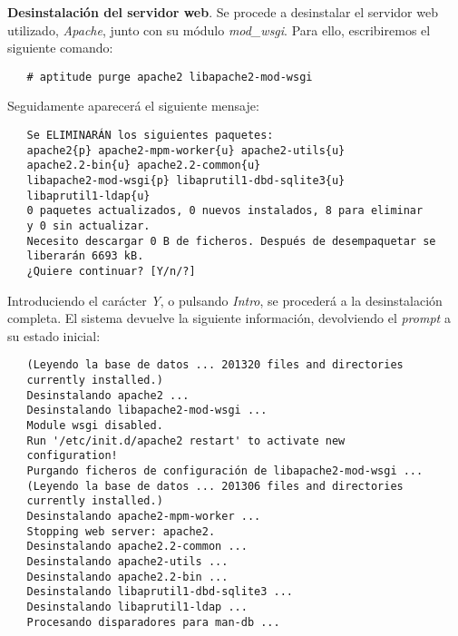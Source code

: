 \item \textbf{Desinstalación del servidor web}.
   Se procede a desinstalar el servidor web utilizado, \textit{Apache}, junto
   con su módulo \textit{mod\_wsgi}. Para ello, escribiremos el siguiente
   comando:

   \begin{verbatim}
   # aptitude purge apache2 libapache2-mod-wsgi
   \end{verbatim}

   Seguidamente aparecerá el siguiente mensaje:

   \begin{verbatim}
   Se ELIMINARÁN los siguientes paquetes:
   apache2{p} apache2-mpm-worker{u} apache2-utils{u}
   apache2.2-bin{u} apache2.2-common{u}
   libapache2-mod-wsgi{p} libaprutil1-dbd-sqlite3{u}
   libaprutil1-ldap{u}
   0 paquetes actualizados, 0 nuevos instalados, 8 para eliminar
   y 0 sin actualizar.
   Necesito descargar 0 B de ficheros. Después de desempaquetar se
   liberarán 6693 kB.
   ¿Quiere continuar? [Y/n/?]
   \end{verbatim}

   Introduciendo el carácter \textit{Y}, o pulsando \textit{Intro}, se procederá
   a la desinstalación completa. El sistema devuelve la siguiente información,
   devolviendo el \textit{prompt} a su estado inicial:

   \begin{verbatim}
   (Leyendo la base de datos ... 201320 files and directories
   currently installed.)
   Desinstalando apache2 ...
   Desinstalando libapache2-mod-wsgi ...
   Module wsgi disabled.
   Run '/etc/init.d/apache2 restart' to activate new
   configuration!
   Purgando ficheros de configuración de libapache2-mod-wsgi ...
   (Leyendo la base de datos ... 201306 files and directories
   currently installed.)
   Desinstalando apache2-mpm-worker ...
   Stopping web server: apache2.
   Desinstalando apache2.2-common ...
   Desinstalando apache2-utils ...
   Desinstalando apache2.2-bin ...
   Desinstalando libaprutil1-dbd-sqlite3 ...
   Desinstalando libaprutil1-ldap ...
   Procesando disparadores para man-db ...
   \end{verbatim}
